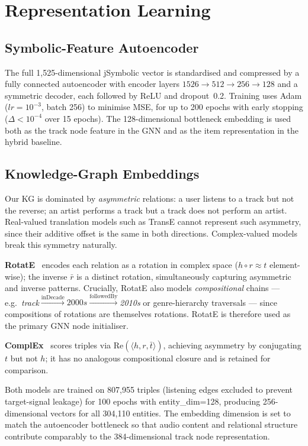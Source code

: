 \section{Representation Learning}
\label{sec:models}

\subsection{Symbolic-Feature Autoencoder}

The full 1,525-dimensional jSymbolic vector is standardised and compressed by a fully connected autoencoder with encoder layers $1526\!\to\!512\!\to\!256\!\to\!128$ and a symmetric decoder, each followed by ReLU and dropout~0.2. Training uses Adam ($lr=10^{-3}$, batch 256) to minimise MSE, for up to 200 epochs with early stopping ($\Delta<10^{-4}$ over 15 epochs). The 128-dimensional bottleneck embedding is used both as the track node feature in the GNN and as the item representation in the hybrid baseline.

\subsection{Knowledge-Graph Embeddings}

Our KG is dominated by \textit{asymmetric} relations: a user listens to a track but not the reverse; an artist performs a track but a track does not perform an artist. Real-valued translation models such as TransE cannot represent such asymmetry, since their additive offset is the same in both directions. Complex-valued models break this symmetry naturally.

\textbf{RotatE}~\cite{sun2019rotate} encodes each relation as a rotation in complex space ($h\circ r\approx t$ element-wise); the inverse $\bar{r}$ is a distinct rotation, simultaneously capturing asymmetric and inverse patterns. Crucially, RotatE also models \textit{compositional} chains — e.g.\ \textit{track}$\xrightarrow{\text{inDecade}}\textit{2000s}\xrightarrow{\text{followedBy}}$\textit{2010s} or genre-hierarchy traversals — since compositions of rotations are themselves rotations. RotatE is therefore used as the primary GNN node initialiser.

\textbf{ComplEx}~\cite{trouillon2016complex} scores triples via $\mathrm{Re}(\langle h,r,\bar{t}\rangle)$, achieving asymmetry by conjugating $t$ but not $h$; it has no analogous compositional closure and is retained for comparison.

Both models are trained on 807,955 triples (listening edges excluded to prevent target-signal leakage) for 100 epochs with entity\_dim=128, producing 256-dimensional vectors for all 304,110 entities. The embedding dimension is set to match the autoencoder bottleneck so that audio content and relational structure contribute comparably to the 384-dimensional track node representation.

